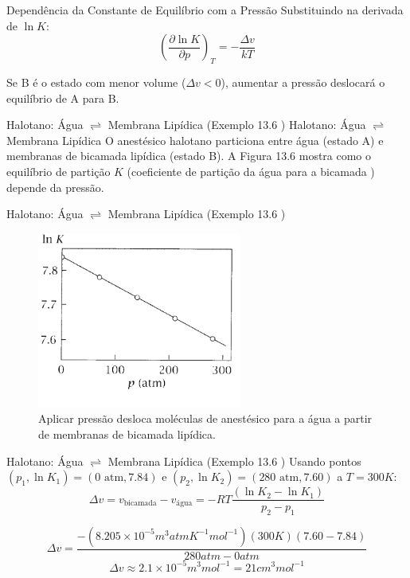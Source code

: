\documentclass{beamer}
\begin{document}
\begin{frame}{Dependência da Constante de Equilíbrio com a Pressão}
    Substituindo na derivada de $\ln K$:
    $$ \left(\frac{\partial \ln K}{\partial p}\right)_T = -\frac{\Delta v}{kT} $$
    
    Se B é o estado com menor volume ($\Delta v < 0$), aumentar a pressão deslocará o equilíbrio de A para B.
\end{frame}

\begin{frame}{Halotano: Água $\rightleftharpoons$ Membrana Lipídica (Exemplo 13.6 )}
    Halotano: Água $\rightleftharpoons$ Membrana Lipídica 
        O anestésico halotano particiona entre água (estado A) e membranas de bicamada lipídica (estado B).
        A Figura 13.6 mostra como o equilíbrio de partição $K$ (coeficiente de partição da água para a bicamada ) depende da pressão.
\end{frame}

\begin{frame}{Halotano: Água $\rightleftharpoons$ Membrana Lipídica (Exemplo 13.6 )}
        \begin{figure}
        \centering
        \includegraphics[width=0.6\textwidth]{figs/pressure_K.png}
        \caption{Aplicar pressão desloca moléculas de anestésico para a água a partir de membranas de bicamada lipídica.}
        \end{figure}
        
\end{frame}

\begin{frame}{Halotano: Água $\rightleftharpoons$ Membrana Lipídica (Exemplo 13.6 )}
        Usando pontos $(p_1, \ln K_1) = (0 \text{ atm}, 7.84)$ e $(p_2, \ln K_2) = (280 \text{ atm}, 7.60)$ a $T=300K$:
        $$ \Delta v = v_{\text{bicamada}} - v_{\text{água}} = -RT \frac{(\ln K_2 - \ln K_1)}{p_2 - p_1} $$
        
        $$ \Delta v = \frac{-(8.205 \times 10^{-5} m^3 atm K^{-1} mol^{-1})(300K)(7.60 - 7.84)}{280 atm - 0 atm} $$
        $$ \Delta v \approx 2.1 \times 10^{-5} m^3 mol^{-1} = 21 cm^3 mol^{-1} $$
        
\end{frame}
\end{document}
